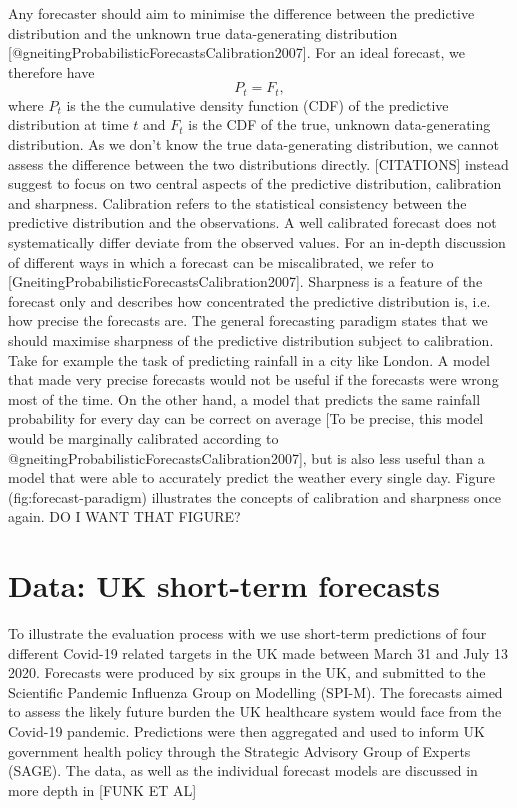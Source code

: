 \documentclass[article]{jss}
\begin{document}
Any forecaster should aim to minimise the difference between the predictive distribution and the unknown true data-generating distribution [@gneitingProbabilisticForecastsCalibration2007]. For an ideal forecast, we therefore have 
$$ P_t = F_t, $$
where $P_t$ is the the cumulative density function (CDF) of the predictive distribution at time $t$ and $F_t$ is the CDF of the true, unknown data-generating distribution. As we don't know the true data-generating distribution, we cannot assess the difference between the two distributions directly. [CITATIONS] instead suggest to focus on two central aspects of the predictive distribution, calibration and sharpness. Calibration refers to the statistical consistency between the predictive distribution and the observations. A well calibrated forecast does not systematically differ deviate from the observed values. For an in-depth discussion of different ways in which a forecast can be miscalibrated, we refer to [GneitingProbabilisticForecastsCalibration2007]. Sharpness is a feature of the forecast only and describes how concentrated the predictive distribution is, i.e. how precise the forecasts are. The general forecasting paradigm states that we should maximise sharpness of the predictive distribution subject to calibration. Take for example the task of predicting rainfall in a city like London. A model that made very precise forecasts would not be useful if the forecasts were wrong most of the time. On the other hand, a model that predicts the same rainfall probability for every day can be correct on average [To be precise, this model would be marginally calibrated according to @gneitingProbabilisticForecastsCalibration2007], but is also less useful than a model that were able to accurately predict the weather every single day. Figure \@ref(fig:forecast-paradigm) illustrates the concepts of calibration and sharpness once again. DO I WANT THAT FIGURE? 


\section[data]{Data: UK short-term forecasts}
To illustrate the evaluation process with  we use short-term predictions of four different Covid-19 related targets in the UK made between March 31 and July 13 2020. Forecasts were produced by six groups in the UK, and submitted to the Scientific Pandemic Influenza Group on Modelling (SPI-M). The forecasts aimed to assess the likely future burden the UK healthcare system would face from the Covid-19 pandemic. Predictions were then aggregated and used to inform UK government health policy through the Strategic Advisory Group of Experts (SAGE). The data, as well as the individual forecast models are discussed in more depth in [FUNK ET AL]
\end{document}
